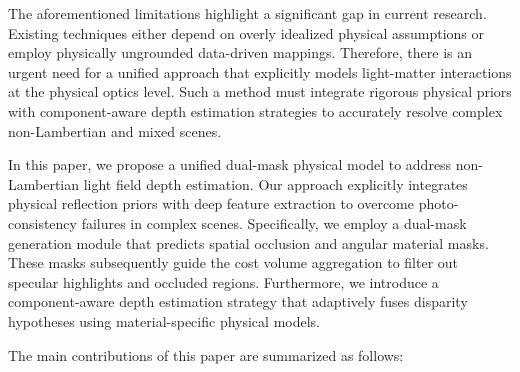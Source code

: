 \documentclass[lettersize,journal]{IEEEtran}
\begin{document}
The aforementioned limitations highlight a significant gap in current research. Existing techniques either depend on overly idealized physical assumptions or employ physically ungrounded data-driven mappings. Therefore, there is an urgent need for a unified approach that explicitly models light-matter interactions at the physical optics level. Such a method must integrate rigorous physical priors with component-aware depth estimation strategies to accurately resolve complex non-Lambertian and mixed scenes.

In this paper, we propose a unified dual-mask physical model to address non-Lambertian light field depth estimation. Our approach explicitly integrates physical reflection priors with deep feature extraction to overcome photo-consistency failures in complex scenes. Specifically, we employ a dual-mask generation module that predicts spatial occlusion and angular material masks. These masks subsequently guide the cost volume aggregation to filter out specular highlights and occluded regions. Furthermore, we introduce a component-aware depth estimation strategy that adaptively fuses disparity hypotheses using material-specific physical models.

The main contributions of this paper are summarized as follows:
\end{document}
